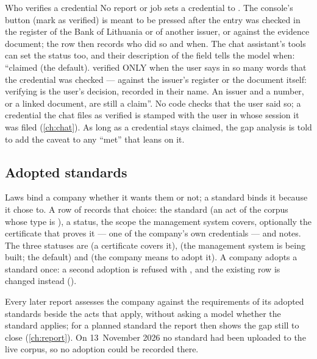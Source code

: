 \begin{humanbox}{Who verifies a credential}
No report or job sets a credential to . The console's button
 (mark as verified) is meant to be pressed after the entry was
checked in the register of the Bank of Lithuania or of another issuer, or against the evidence
document; the row then records who did so and when. The chat assistant's tools can set the
status too, and their description of the field tells the model when: \enquote{claimed (the
default). verified ONLY when the user says in so many words that the credential was checked
--- against the issuer's register or the document itself: verifying is the user's decision,
recorded in their name. An issuer and a number, or a linked document, are still a claim}. No
code checks that the user said so; a credential the chat files as verified is stamped with the
user in whose
session it was filed (\cref{ch:chat}). As long as a credential stays claimed, the gap analysis is told to add
the caveat to any \enquote{met} that leans on it.
\end{humanbox}

\subsection{Adopted standards}\label{sec:company:standards}

Laws bind a company whether it wants them or not; a standard binds it because it chose to. A
row of  records that choice: the standard (an act of the corpus whose
type is ), a status, the scope the management system covers, optionally the
certificate that proves it --- one of the company's own credentials --- and notes. The three
statuses are  (a certificate covers it),  (the management
system is being built; the default) and  (the company means to adopt it). A
company adopts a standard once: a second adoption is refused with , and
the existing row is changed instead ().

Every later report assesses the company against the requirements of its adopted standards
beside the acts that apply, without asking a model whether the standard applies; for a planned
standard the report then shows the gap still to close (\cref{ch:report}). On 13~November 2026
no standard had been uploaded to the live corpus, so no adoption could be recorded there.

